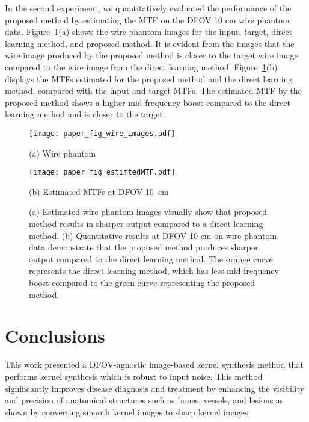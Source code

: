 \documentclass{article}
\begin{document}
In the second experiment, we quantitatively evaluated the performance of the proposed method by estimating the MTF on the DFOV 10 cm wire phantom data. Figure~\ref{fig:mtfestimation}(a) shows the wire phantom images for the input, target, direct learning method, and proposed method. It is evident from the images that the wire image produced by the proposed method is closer to the target wire image compared to the wire image from the direct learning method. Figure~\ref{fig:mtfestimation}(b) displays the MTFs estimated for the proposed method and the direct learning method, compared with the input and target MTFs. The estimated MTF by the proposed method shows a higher mid-frequency boost compared to the direct learning method and is closer to the target.
\begin{figure}
	\begin{minipage}[b]{0.35\linewidth}
		\centering
		\centerline{\texttt{[image: paper\_fig\_wire\_images.pdf]}	}		
		\centerline{(a) Wire phantom }\medskip
	\end{minipage}	
	\begin{minipage}[b]{0.62\linewidth}
		\centering
		\centerline{\texttt{[image: paper\_fig\_estimtedMTF.pdf]}}		
		\centerline{(b) Estimated MTFs at DFOV 10~cm }\medskip
	\end{minipage}
	\hfill
	\caption{(a) Estimated wire phantom images visually show that proposed method results in sharper output compared to a direct learning method. (b) Quantitative results at DFOV 10 cm on wire phantom data demonstrate that the proposed method produces sharper output compared to the direct learning method. The orange curve represents the direct learning method, which has less mid-frequency boost compared to the green curve representing the proposed method.}
	\label{fig:mtfestimation}
\end{figure}

\section{Conclusions}

This work presented a DFOV-agnostic image-based kernel synthesis method that performs kernel synthesis which is robust to input noise. This method significantly improves disease diagnosis and treatment by enhancing the visibility and precision of anatomical structures such as bones, vessels, and lesions as shown by converting smooth kernel images to sharp kernel images. %
\end{document}
